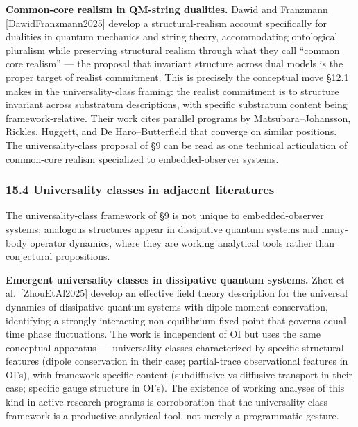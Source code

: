 \documentclass[
]{article}
\begin{document}
\textbf{Common-core realism in QM-string dualities.} Dawid and Franzmann
{[}DawidFranzmann2025{]} develop a structural-realism account
specifically for dualities in quantum mechanics and string theory,
accommodating ontological pluralism while preserving structural realism
through what they call ``common core realism'' --- the proposal that
invariant structure across dual models is the proper target of realist
commitment. This is precisely the conceptual move §12.1 makes in the
universality-class framing: the realist commitment is to structure
invariant across substratum descriptions, with specific substratum
content being framework-relative. Their work cites parallel programs by
Matsubara--Johansson, Rickles, Huggett, and De Haro--Butterfield that
converge on similar positions. The universality-class proposal of §9 can
be read as one technical articulation of common-core realism specialized
to embedded-observer systems.

\hypertarget{universality-classes-in-adjacent-literatures}{%
\subsubsection{15.4 Universality classes in adjacent
literatures}\label{universality-classes-in-adjacent-literatures}}

The universality-class framework of §9 is not unique to
embedded-observer systems; analogous structures appear in dissipative
quantum systems and many-body operator dynamics, where they are working
analytical tools rather than conjectural propositions.

\textbf{Emergent universality classes in dissipative quantum systems.}
Zhou et al.~{[}ZhouEtAl2025{]} develop an effective field theory
description for the universal dynamics of dissipative quantum systems
with dipole moment conservation, identifying a strongly interacting
non-equilibrium fixed point that governs equal-time phase fluctuations.
The work is independent of OI but uses the same conceptual apparatus ---
universality classes characterized by specific structural features
(dipole conservation in their case; partial-trace observational features
in OI's), with framework-specific content (subdiffusive vs diffusive
transport in their case; specific gauge structure in OI's). The
existence of working analyses of this kind in active research programs
is corroboration that the universality-class framework is a productive
analytical tool, not merely a programmatic gesture.
\end{document}
